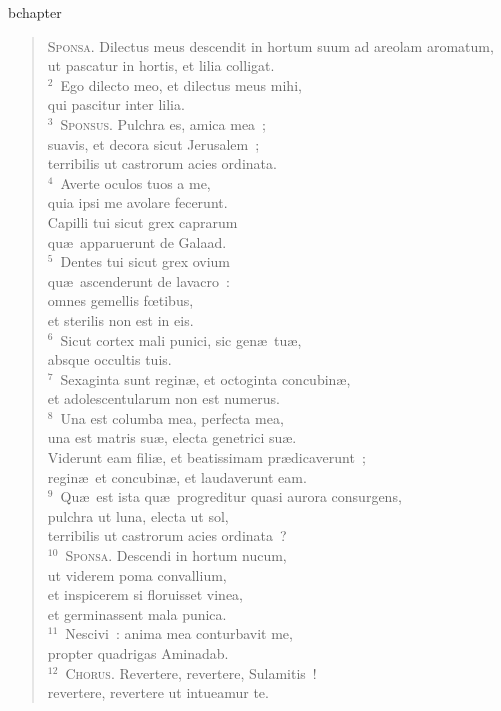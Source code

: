 bchapter\begin{verse}\vspace{-19pt}\textsc{Sponsa.} Dilectus meus descendit in hortum suum ad areolam aromatum,\\ ut pascatur in hortis, et lilia colligat.\\
${}^{2}$~Ego dilecto meo, et dilectus meus mihi,\\ qui pascitur inter lilia.\\
${}^{3}$~\textsc{Sponsus.} Pulchra es, amica mea~;\\ suavis, et decora sicut Jerusalem~;\\ terribilis ut castrorum acies ordinata.\\
${}^{4}$~Averte oculos tuos a me,\\ quia ipsi me avolare fecerunt.\\ Capilli tui sicut grex caprarum\\ qu\ae\ apparuerunt de Galaad.\\
${}^{5}$~Dentes tui sicut grex ovium\\ qu\ae\ ascenderunt de lavacro~:\\ omnes gemellis fœtibus,\\ et sterilis non est in eis.\\
${}^{6}$~Sicut cortex mali punici, sic gen\ae\ tu\ae ,\\ absque occultis tuis.\\
${}^{7}$~Sexaginta sunt regin\ae , et octoginta concubin\ae ,\\ et adolescentularum non est numerus.\\
${}^{8}$~Una est columba mea, perfecta mea,\\ una est matris su\ae , electa genetrici su\ae .\\ Viderunt eam fili\ae , et beatissimam pr\ae dicaverunt~;\\ regin\ae\ et concubin\ae , et laudaverunt eam.\\
${}^{9}$~Qu\ae\ est ista qu\ae\ progreditur quasi aurora consurgens,\\ pulchra ut luna, electa ut sol,\\ terribilis ut castrorum acies ordinata~?\\
${}^{10}$~\textsc{Sponsa.} Descendi in hortum nucum,\\ ut viderem poma convallium,\\ et inspicerem si floruisset vinea,\\ et germinassent mala punica.\\
${}^{11}$~Nescivi~: anima mea conturbavit me,\\ propter quadrigas Aminadab.\\
${}^{12}$~\textsc{Chorus.} Revertere, revertere, Sulamitis~!\\ revertere, revertere ut intueamur te.\end{verse}


